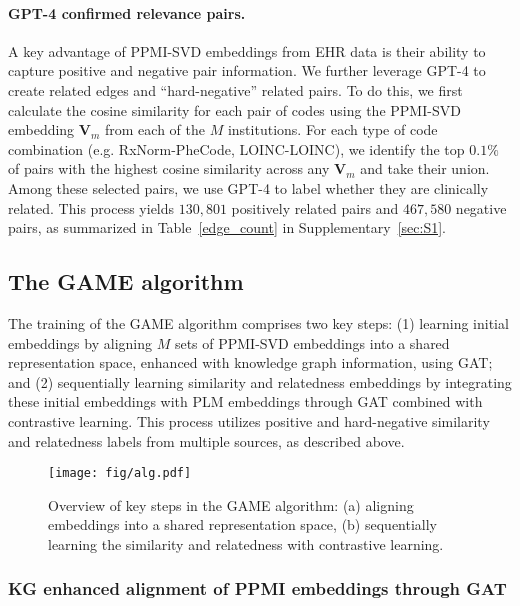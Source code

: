 \documentclass{article}
\def\V{\mathbf{V}}
\begin{document}
\paragraph{GPT-4 confirmed relevance pairs.} A key advantage of PPMI-SVD embeddings from EHR data is their ability to capture positive and negative pair information. We further leverage GPT-4 to create related edges and ``hard-negative'' related pairs. To do this, we first calculate the cosine similarity for each pair of codes using the PPMI-SVD embedding $\V_m$ from each of the $M$ institutions. For each type of code combination (e.g. RxNorm-PheCode, LOINC-LOINC), we identify the top $0.1\%$ of pairs with the highest cosine similarity across any $\V_m$ and take their union. Among these selected pairs, we use GPT-4 to label whether they are clinically related. This process yields $130,801$ positively related pairs and $467,580$ negative pairs, as summarized in Table~\ref{edge_count} in Supplementary~\ref{sec:S1}. 


\subsection{The GAME algorithm}
\label{sec:GAME}


The training of the GAME algorithm comprises two key steps: (1) learning initial embeddings by aligning $M$ sets of PPMI-SVD embeddings into a shared representation space, enhanced with knowledge graph information, using GAT; and (2) sequentially learning similarity and relatedness embeddings by integrating these initial embeddings with PLM embeddings through GAT combined with contrastive learning. This process utilizes positive and hard-negative similarity and relatedness labels from multiple sources, as described above.


\begin{figure}[!htbp]
    \centering
    \texttt{[image: fig/alg.pdf]}
    \caption{Overview of key steps in the GAME algorithm: (a) aligning embeddings into a shared representation space, (b) sequentially learning the similarity and relatedness with contrastive learning.}
    \label{fig:enter-label}
\end{figure}


\subsubsection{KG enhanced alignment of PPMI embeddings through GAT} 
\end{document}

